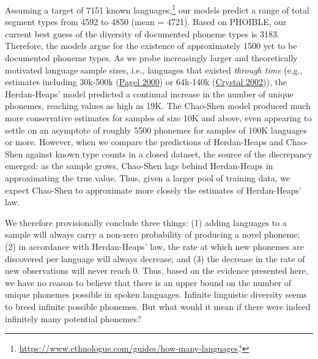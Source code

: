 \documentclass[
]{article}
\begin{document}
Assuming a target of 7151 known languages,\footnote{\url{https://www.ethnologue.com/guides/how-many-languages}?}
our models predict a range of total segment types from 4592 to 4850
(mean = 4721). Based on PHOIBLE, our current best guess of the diversity
of documented phoneme types is 3183. Therefore, the models argue for the
existence of approximately 1500 yet to be documented phoneme types. As
we probe increasingly larger and theoretically motivated language sample
sizes, i.e., languages that existed \emph{through time} (e.g., estimates
including 30k-500k (\protect\hyperlink{ref-Pagel2000}{Pagel 2000}) or
64k-140k (\protect\hyperlink{ref-Crystal2002}{Crystal 2002})), the
Herdan-Heaps' model predicted a continual increase in the number of
unique phonemes, reaching values as high as 19K. The Chao-Shen model
produced much more conservative estimates for samples of size 10K and
above, even appearing to settle on an asymptote of roughly 5500 phonemes
for samples of 100K languages or more. However, when we compare the
predictions of Herdan-Heaps and Chao-Shen against known type counts in a
closed dataset, the source of the discrepancy emerged: as the sample
grows, Chao-Shen lags behind Herdan-Heaps in approximating the true
value. Thus, given a larger pool of training data, we expect Chao-Shen
to approximate more closely the estimates of Herdan-Heaps' law.

We therefore provisionally conclude three things: (1) adding languages
to a sample will always carry a non-zero probability of producing a
novel phoneme; (2) in accordance with Herdan-Heaps' law, the rate at
which new phonemes are discovered per language will always decrease; and
(3) the decrease in the rate of new observations will never reach 0.
Thus, based on the evidence presented here, we have no reason to believe
that there is an upper bound on the number of unique phonemes possible
in spoken languages. Infinite linguistic diversity seems to breed
infinite possible phonemes. But what would it mean if there were indeed
infinitely many potential phonemes?
\end{document}
